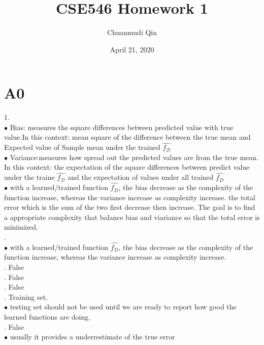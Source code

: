 \documentclass[12pt]{article}
\title{\vspace{-7.5ex}\textbf{\Large CSE546 Homework 1}\vspace{-1.7ex}}
\author{Chuanmudi Qin}
\date{\vspace{-1ex}April 21, 2020\vspace{-5ex}}
\begin{document}
\maketitle
\section*{A0}
1.  \\
$\bullet$ Bias: measures the square differences between predicted value with true value.In this context: mean square of the difference between the true mean and Expected value of Sample mean under the trained $\widehat{f_{\mathcal{D}}}$\\ 
$\bullet$  Variance:measures how spread out the predicted values are from the true mean. In this context:  the expectation of the square differences between predict value under the traine $\widehat{f_{\mathcal{D}}}$ and the expectation of values under all trained $\widehat{f_D}$\\ 
$\bullet$ with a learned/trained function $\widehat{f_D}$, the bias decrease as the complexity of the function increase, whereas the variance increase as complexity increase. the total error which is the sum of the two first decrease then increase. The goal is to find a appropriate complexity that balance bias and viariance so that the total error is minimized.\\

. \\
$\bullet$ with a learned/trained function $\widehat{f_D}$, the bias decrease as the complexity of the function increase, whereas the variance increase as complexity increase.\\

. False \\

. False \\

. False \\

. Training set. \\
$\bullet$ testing set should not be used until we are ready to report how good the learned functions are doing.\\

. False \\
$\bullet$ usually it provides a underrestimate of the true error  
\newpage
\end{document}
